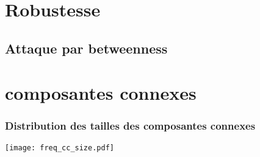 \documentclass[aspectratio=169]{beamer}
\begin{document}
    \section{Robustesse}
    \subsection{Attaque par betweenness}
    \section{composantes connexes}
    \begin{frame}
        \frametitle{Distribution des tailles des composantes connexes}
        \centering
        \texttt{[image: freq\_cc\_size.pdf]}
    \end{frame}
\end{document}
